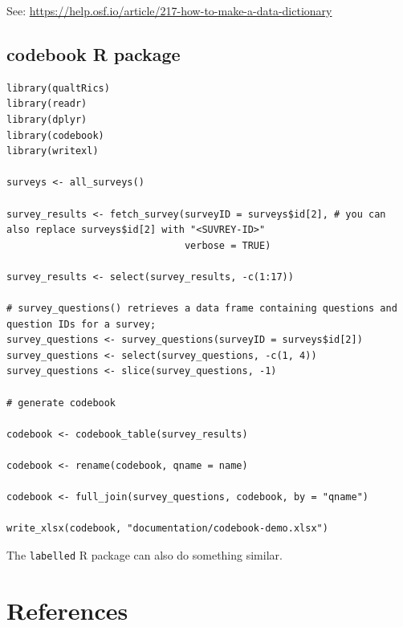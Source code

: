 \documentclass[
  letterpaper,
  DIV=11,
  numbers=noendperiod]{scrreprt}
\newlength{\cslhangindent}
\newlength{\cslentryspacingunit} %
\newenvironment{CSLReferences}[2] %
 {%
  \setlength{\parindent}{0pt}
  \ifodd #1
  \let\oldpar\par
  \def\par{\hangindent=\cslhangindent\oldpar}
  \fi
  \setlength{\parskip}{#2\cslentryspacingunit}
 }%
 {}
\begin{document}
See: \url{https://help.osf.io/article/217-how-to-make-a-data-dictionary}

\hypertarget{codebook-r-package}{%
\section*{codebook R package}\label{codebook-r-package}}


\begin{verbatim}
library(qualtRics)
library(readr)
library(dplyr)
library(codebook)
library(writexl)

surveys <- all_surveys()

survey_results <- fetch_survey(surveyID = surveys$id[2], # you can also replace surveys$id[2] with "<SUVREY-ID>"
                               verbose = TRUE)

survey_results <- select(survey_results, -c(1:17))

# survey_questions() retrieves a data frame containing questions and question IDs for a survey;
survey_questions <- survey_questions(surveyID = surveys$id[2])
survey_questions <- select(survey_questions, -c(1, 4))
survey_questions <- slice(survey_questions, -1)
  
# generate codebook

codebook <- codebook_table(survey_results)

codebook <- rename(codebook, qname = name)

codebook <- full_join(survey_questions, codebook, by = "qname")

write_xlsx(codebook, "documentation/codebook-demo.xlsx")
\end{verbatim}

The \texttt{labelled} R package can also do something similar.


\hypertarget{references-2}{%
\chapter*{References}\label{references-2}}


\hypertarget{refs}{}
\begin{CSLReferences}{0}{0}
\end{CSLReferences}
\end{document}
